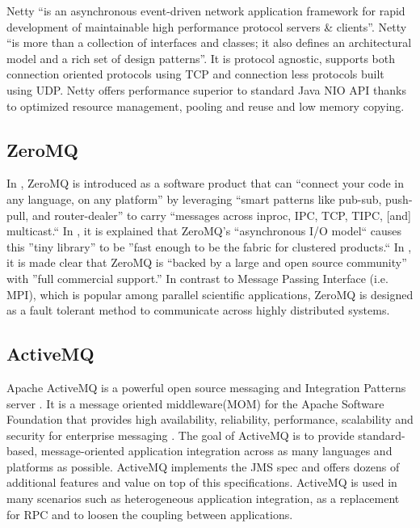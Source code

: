      Netty \cite{www-netty} ``is an asynchronous event-driven network
     application framework for rapid development of maintainable high
     performance protocol servers \& clients''. Netty \cite{netty-book}
     ``is more than a collection of interfaces and classes; it also
     defines an architectural model and a rich set of design
     patterns''. It is protocol agnostic, supports both connection
     oriented protocols using TCP and connection less protocols built
     using UDP. Netty offers performance superior to standard Java NIO
     API thanks to optimized resource management, pooling and reuse
     and low memory copying.
     
\subsection{ ZeroMQ}

     In \cite{www-zeromq}, ZeroMQ is introduced as a software product 
     that can ``connect your code in any language, on any platform'' by 
     leveraging ``smart patterns like pub-sub, push-pull, and 
     router-dealer'' to carry ``messages across inproc, IPC, TCP, TIPC, 
     [and] multicast.`` In \cite{www-zeromq2}, it is explained that 
     ZeroMQ's ``asynchronous I/O model`` causes this ''tiny library'' to 
     be ''fast enough to be the fabric for clustered products.`` In 
     \cite{www-zeromq}, it is made clear that ZeroMQ is ``backed by a 
     large and open source community'' with ''full commercial support.'' 
     In contrast to Message Passing Interface (i.e. MPI), which is 
     popular among parallel scientific applications, ZeroMQ is 
     designed as a fault tolerant method to communicate across highly 
     distributed systems. 

\subsection{ ActiveMQ}

     Apache ActiveMQ is a powerful open source messaging and
     Integration Patterns server \cite{www-activeMQ}. It is a message
     oriented middleware(MOM) for the Apache Software Foundation that
     provides high availability, reliability, performance, scalability
     and security for enterprise messaging \cite{ActiveMQ-book}. The
     goal of ActiveMQ is to provide standard-based, message-oriented
     application integration across as many languages and platforms as
     possible. ActiveMQ implements the JMS spec and offers dozens of
     additional features and value on top of this
     specifications. ActiveMQ is used in many scenarios such as
     heterogeneous application integration, as a replacement for RPC
     and to loosen the coupling between applications.
     
